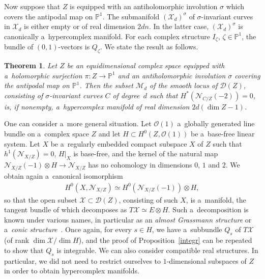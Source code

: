 \documentclass[pdftex]{sigma}
\numberwithin{equation}{section}
\newtheorem{Theorem}{Theorem}[section]
\begin{document}
Now suppose that $Z$ is equipped with an antiholomorphic involution $\sigma$ which covers the antipodal map on
${\mathbb{P}}^1$.
The submanifold $({\mathcal{X}}_d)^\sigma$ of $\sigma$-invariant curves in ${\mathcal{X}}_d$ is either empty or of real
dimension $2dn$.
In the latter case, $({\mathcal{X}}_d)^\sigma$ is canonically a~hypercomplex manifold.
For each complex structure $I_\zeta$, $\zeta\in {\mathbb{P}}^1$, the bundle of $(0,1)$-vectors is $Q_\zeta$.
We state the result as follows.
\begin{Theorem}\label{hc}
Let $Z$ be an equidimensional complex space equipped with a~holomorphic surjection $\pi:Z\to {\mathbb{P}}^1$ and an
antiholomorphic involution $\sigma$ covering the antipodal map on ${\mathbb{P}}^1$.
Then the subset ${\mathcal{M}}_d$ of the smooth locus of ${\mathcal{D}}(Z)$, consisting of $\sigma$-invariant curves $C$
of degree~$d$ such that $H^\ast({\mathcal{N}}_{C/Z}(-2))=0$, is, if nonempty, a~hypercomplex manifold of real dimension
$2d(\dim Z -1)$.
\end{Theorem}

\begin{Remark}
[a~generalisation] One can consider a~more general situation.
Let ${\mathcal{O}}(1)$ a~globally generated line bundle on a~complex space $Z$ and let $H\subset
H^0(Z,{\mathcal{O}}(1))$ be a~base-free linear system.
Let $X$ be a~regularly embedded compact subspace $X$ of $Z$ such that $h^1({\mathcal{N}}_{X/Z})=0$, $H|_X$ is base-free,
and the kernel of the natural map ${\mathcal{N}}_{X/Z}(-1)\otimes H\to {\mathcal{N}}_{X/Z}$ has no cohomology in
dimensions $0$, $1$ and $2$.
We obtain again a~canonical isomorphism
\begin{gather*}
H^0(X,{\mathcal{N}}_{X/Z})\simeq H^0({\mathcal{N}}_{X/Z}(-1))\otimes H,
\end{gather*}
so that the open subset ${\mathcal{X}}\subset
{\mathcal{D}}(Z)$, consisting of such $X$, is a~manifold, the tangent bundle of which decomposes as
$T{\mathcal{X}}\simeq E\otimes H$.
Such a~decomposition is known under various names, in particular as an {\em almost Grassmann structure} or a~{\em conic
structure}~\cite{Ma}.
Once again, for every $s\in H$, we have a~subbundle $Q_s$ of $T{\mathcal{X}}$ (of rank $\dim {\mathcal{X}}/\dim H$), and
the proof of Proposition~\ref{integr} can be repeated to show that $Q_s$ is integrable.
We can also consider compatible real structures.
In particular, we did not need to restrict ourselves to $1$-dimensional subspaces of $Z$ in order to obtain hypercomplex
manifolds.
\label{Grass}
\end{Remark}
\end{document}
